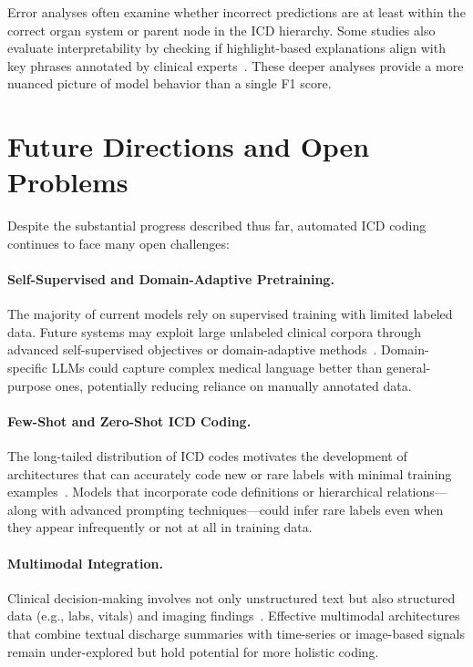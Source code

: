 Error analyses often examine whether incorrect predictions are at least within the correct organ system or parent node in the ICD hierarchy. Some studies also evaluate interpretability by checking if highlight-based explanations align with key phrases annotated by clinical experts~\citep{mullenbach2018explainable}. These deeper analyses provide a more nuanced picture of model behavior than a single F1 score.

\section{Future Directions and Open Problems}

Despite the substantial progress described thus far, automated ICD coding continues to face many open challenges:

\paragraph{Self-Supervised and Domain-Adaptive Pretraining.} The majority of current models rely on supervised training with limited labeled data. Future systems may exploit large unlabeled clinical corpora through advanced self-supervised objectives or domain-adaptive methods~\citep{gururangan2020donotstop}. Domain-specific LLMs could capture complex medical language better than general-purpose ones, potentially reducing reliance on manually annotated data.

\paragraph{Few-Shot and Zero-Shot ICD Coding.} The long-tailed distribution of ICD codes motivates the development of architectures that can accurately code new or rare labels with minimal training examples~\citep{rios2018few, yang2023fewshoticd}. Models that incorporate code definitions or hierarchical relations—along with advanced prompting techniques—could infer rare labels even when they appear infrequently or not at all in training data.

\paragraph{Multimodal Integration.} Clinical decision-making involves not only unstructured text but also structured data (e.g., labs, vitals) and imaging findings~\citep{choi2016doctorai}. Effective multimodal architectures that combine textual discharge summaries with time-series or image-based signals remain under-explored but hold potential for more holistic coding.

